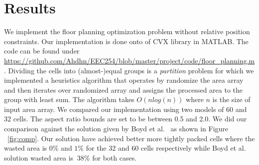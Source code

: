 \documentclass[12pt] {article}
\begin{document}
\section{Results}
We implement the floor planning optimization problem without relative position constraints. Our implementation is done onto of CVX library in MATLAB. The code can be found under \url{https://github.com/Ahdhn/EEC254/blob/master/project/code/floor_planning.m}. Dividing the cells into (almost-)equal groups is a \emph{partition} problem for which we implemented a %
heuristics algorithm that operates by randomize the area array and then iterates over randomized array and assigns the processed area to the group with least sum. The algorithm takes $O(nlog(n))$ where $n$ is the size of input area array. We compared our implementation using two models of 60 and 32 cells. The aspect ratio bounds are set to be between 0.5 and 2.0. We did our comparison against the solution given by Boyd et al.~\citep{boyd2004convex} as shown in Figure ~\ref{fig:comp}. Our solution have achieved better more tightly packed cells where the wasted area is $0\%$ and $1\%$ for the 32 and 60 cells respectively while Boyd et al. solution wasted area is $~38\%$ for both cases. 
\end{document}
